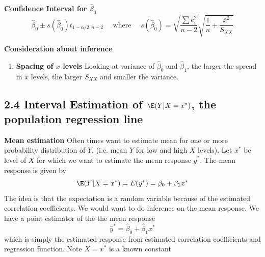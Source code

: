 \documentclass[11pt]{article}
\begin{document}
\begin{defn*}
	\textbf{Confidence Interval for $\hat{\beta}_0$}\\
	\[
		\hat{\beta}_0 \pm s(\hat{\beta}_0) t_{1-\alpha/2, n-2} \quad \text{ where } \quad s(\hat{\beta}_0) = \sqrt{\frac{\sum e_i^2}{n-2}} \sqrt{\frac{1}{n} + \frac{\overline{x}^2}{S_{XX}}}
	\]
\end{defn*}



\begin{defn*}
	\textbf{Consideration about inference}
	\begin{enumerate}
		\item \textbf{Spacing of $x$ levels} Looking at variance of $\hat{\beta}_0$ and $\hat{\beta}_1$, the larger the spread in $x$ levels, the larger $S_{XX}$ and smaller the variance. 
	\end{enumerate}
\end{defn*}



\subsection*{2.4 Interval Estimation of $\E(Y | X = x^*)$, the population regression line}


\begin{defn*}
	\textbf{Mean estimation} Often times want to estimate mean for one or more probability distribution of $Y$. (i.e. mean $Y$ for low and high $X$ levels). Let $x^*$ be level of $X$ for which we want to estimate the mean response $\hat{y}^*$. The mean response is given by 
	\[
		\E(Y | X = x^*) = E(y^*) = \beta_0 + \beta_1 x^*
	\]
	The idea is that the expectation is a random variable because of the estimated correlation coefficients. We would want to do inference on the mean response. We have a point estimator of the the mean response
	\[
		\hat{y}^* = \hat{\beta}_0 + \hat{\beta}_1 x^*
	\]
	which is simply the estimated response from estimated correlation coefficients and regression function. Note $X = x^*$ is a known constant 
\end{defn*}
\end{document}

